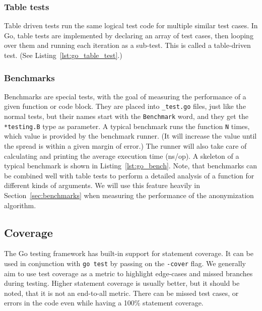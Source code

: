 \subsubsection{Table tests}
Table driven tests run the same logical test code for multiple similar test cases. In Go, table tests are implemented by declaring an array of test cases, then looping over them and running each iteration as a sub-test. This is called a table-driven test. (See Listing~\ref{lst:go_table_test}.)



\subsubsection{Benchmarks}\label{subsec:benchmarks}
Benchmarks are special tests, with the goal of measuring the performance of a given function or code block. They are placed into \texttt{\_test.go} files, just like the normal tests, but their names start with the \texttt{Benchmark} word, and they get the \texttt{*testing.B} type as parameter. A typical benchmark runs the function \texttt{N} times, which value is provided by the benchmark runner. (It will increase the value until the spread is within a given margin of error.) The runner will also take care of calculating and printing the average execution time (ns/op). A skeleton of a typical benchmark is shown in Listing~\ref{lst:go_bench}. Note, that benchmarks can be combined well with table tests to perform a detailed analysis of a function for different kinds of arguments. We will use this feature heavily in Section~\ref{sec:benchmarks} when measuring the performance of the anonymization algorithm.



\subsection{Coverage}
The Go testing framework has built-in support for statement coverage. It can be used in conjunction with \texttt{go test} by passing on the \texttt{-cover} flag. We generally aim to use test coverage as a metric to highlight edge-cases and missed branches during testing. Higher statement coverage is usually better, but it should be noted, that it is not an end-to-all metric. There can be missed test cases, or errors in the code even while having a 100\% statement coverage.